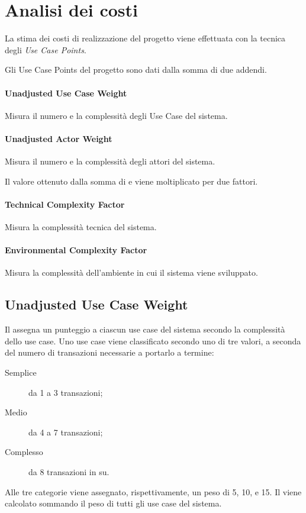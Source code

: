 \section{Analisi dei costi}

La stima dei costi di realizzazione del progetto viene effettuata con la tecnica degli \emph{Use Case Points}.

Gli Use Case Points del progetto sono dati dalla somma di due addendi.

\paragraph{Unadjusted Use Case Weight}
	Misura il numero e la complessit\`a degli Use Case del sistema.

\paragraph{Unadjusted Actor Weight}
	Misura il numero e la complessit\`a degli attori del sistema.

Il valore ottenuto dalla somma di  e  viene moltiplicato per due fattori.

\paragraph{Technical Complexity Factor}
	Misura la complessit\`a tecnica del sistema.

\paragraph{Environmental Complexity Factor}
	Misura la complessit\`a dell'ambiente in cui il sistema viene sviluppato.

\subsection{Unadjusted Use Case Weight}

Il  assegna un punteggio a ciascun use case del sistema secondo la complessit\`a dello use case.
Uno use case viene classificato secondo uno di tre valori, a seconda del numero di transazioni necessarie a portarlo a termine:
\begin{description}
	\item[Semplice] da 1 a 3 transazioni;
	\item[Medio] da 4 a 7 transazioni;
	\item[Complesso] da 8 transazioni in su.
\end{description}
Alle tre categorie viene assegnato, rispettivamente, un peso di 5, 10, e 15.
Il  viene calcolato sommando il peso di tutti gli use case del sistema.

